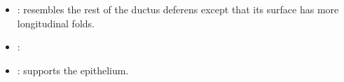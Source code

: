 \begin{multicols}{2}
\begin{itemize}
  \begin{center}
  \end{center}
  
  \item {}: resembles the rest of the ductus deferens except that its surface has more longitudinal folds.
  
  \begin{center}
  \end{center}
  
  \item {}:
  
  \begin{center}
  \end{center}
  
  \item {}: supports the epithelium.
  
  \begin{center}
  \end{center}
  
  
\end{itemize}
\end{multicols}

